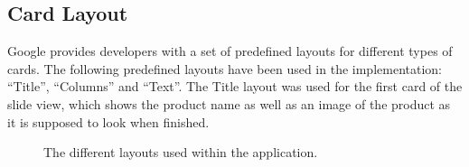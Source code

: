 

\subsection{Card Layout}
Google provides developers with a set of predefined layouts for different types of cards. The following predefined layouts have been used in the implementation: ``Title'', ``Columns'' and ``Text''. The Title layout was used for the first card of the slide view, which shows the product name as well as an image of the product as it is supposed to look when finished.

	\begin{figure}[H]%
		\centering
   		 \qquad
   		 \qquad
    		\qquad
   		 \qquad
		\caption{The different layouts used within the application.}
		\label{fig:cardLayout}
	\end{figure}

